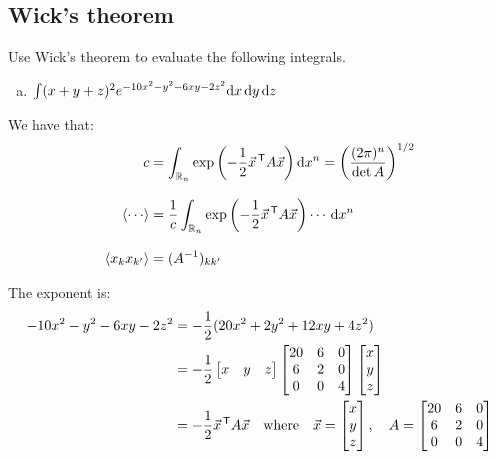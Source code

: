 \subsection{Wick's theorem}

Use Wick's theorem to evaluate the following integrals.

\begin{enumerate}[(a)]
  \item $\int (x + y + z)^2 e^{-10x^2 - y^2 - 6xy - 2z^2} \text{d}{}{x}\,\text{d}{}{y}\,\text{d}{}{z}$
\end{enumerate}

We have that:
\begin{align}
  c
   & =
  \int_{\mathbb{R}_n} \exp\left(-\frac{1}{2} {\vec{x}}^{\,\mathsf{T}} {A} \vec{x}\right) \text{d}{}{x}^n =
  \left(\frac{(2\pi)^n}{\det{A}}\right)^{1/2}
  \\[2ex]
  \left\langle{\cdots}\right\rangle
   & =
  \frac{1}{c} \int_{\mathbb{R}_n} \exp\left(-\frac{1}{2} {\vec{x}}^{\,\mathsf{T}} {A} \vec{x}\right) \cdots\,\text{d}{}{x}^n
  \\[2ex]
  \left\langle{x_k x_{k^\prime}}\right\rangle
   & =
  (A^{-1})_{k {k^\prime}}
\end{align}

The exponent is:
\begin{align*}
  -10x^2 - y^2 - 6xy - 2z^2
   & =
  -\frac{1}{2}(20x^2 + 2y^2 + 12xy + 4z^2)
  \\
   & =
  -\frac{1}{2}
  \begin{bmatrix}
    x & y & z
  \end{bmatrix}
  \begin{bmatrix}
    20 & 6 & 0
    \\
    6  & 2 & 0
    \\
    0  & 0 & 4
  \end{bmatrix}
  \begin{bmatrix}
    x
    \\
    y
    \\
    z
  \end{bmatrix}
  \\
   & =
  -\frac{1}{2} {\vec{x}}^{\,\mathsf{T}} {A} \vec{x}
  \quad\text{where}\quad
  \vec{x} =
  \begin{bmatrix}
    x
    \\
    y
    \\
    z
  \end{bmatrix}
  ,\quad
  {A} =
  \begin{bmatrix}
    20 & 6 & 0
    \\
    6  & 2 & 0
    \\
    0  & 0 & 4
  \end{bmatrix}
\end{align*}

